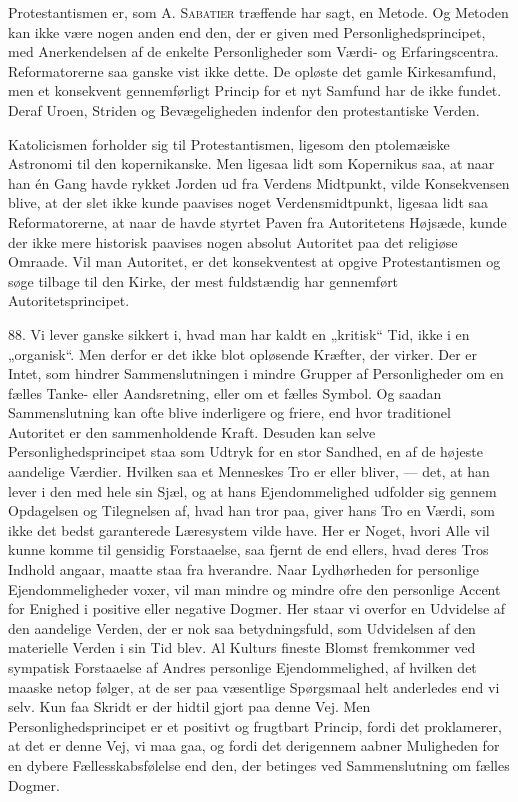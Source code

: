\documentclass[12pt,a4paper,openany]{book}
\newcommand{\opage}[1]{\marginnote{\footnotesize\textit{[#1]}}}
\begin{document}
Protestantismen er, som A. \textsc{Sabatier} træffende har sagt, en
Metode. Og Metoden kan ikke være nogen anden end den, der er given med
Personlighedsprincipet, med Anerkendelsen af de enkelte Personligheder
som Værdi- og Erfaringscentra. Reformatorerne saa ganske vist ikke
dette. De opløste det gamle Kirkesamfund, men et konsekvent
gennemførligt Princip for et nyt Samfund har de ikke fundet. Deraf
Uroen, Striden og Bevægeligheden indenfor den protestantiske Verden.

\opage{203}Katolicismen forholder sig til Protestantismen, ligesom den
ptolemæiske Astronomi til den kopernikanske. Men ligesaa lidt som
Kopernikus saa, at naar han én Gang havde rykket Jorden ud fra Verdens
Midtpunkt, vilde Konsekvensen blive, at der slet ikke kunde paavises
noget Verdensmidtpunkt, ligesaa lidt saa Reformatorerne, at naar de
havde styrtet Paven fra Autoritetens Højsæde, kunde der ikke mere
historisk paavises nogen absolut Autoritet paa det religiøse Omraade.
Vil man Autoritet, er det konsekventest at opgive Protestantismen og
søge tilbage til den Kirke, der mest fuldstændig har gennemført
Autoritetsprincipet.

88. Vi lever ganske sikkert i, hvad man har kaldt en „kritisk“ Tid, ikke
i en „organisk“. Men derfor er det ikke blot opløsende Kræfter, der
virker. Der er Intet, som hindrer Sammenslutningen i mindre Grupper af
Personligheder om en fælles Tanke- eller Aandsretning, eller om et
fælles Symbol. Og saadan Sammenslutning kan ofte blive inderligere og
friere, end hvor traditionel Autoritet er den sammenholdende Kraft.
Desuden kan selve Personlighedsprincipet staa som Udtryk for en stor
Sandhed, en af de højeste aandelige Værdier. Hvilken saa et Menneskes
Tro er eller bliver, --- det, at han lever i den med hele sin Sjæl, og
at hans Ejendommelighed udfolder sig gennem Opdagelsen og Tilegnelsen
af, hvad han tror paa, giver hans Tro en Værdi, som ikke det bedst
garanterede Læresystem vilde have. Her er Noget, hvori Alle vil kunne
komme til gensidig Forstaaelse, saa fjernt de end ellers, hvad deres
Tros Indhold angaar, maatte staa fra hverandre. Naar Lydhørheden for
personlige Ejendommeligheder voxer, vil man mindre og mindre ofre den
personlige Accent for Enighed i positive eller negative Dogmer. Her
staar vi overfor en Udvidelse af den aandelige Verden, der er nok saa
betydningsfuld, som Udvidelsen af den materielle Verden i sin Tid blev.
Al Kulturs fineste Blomst fremkommer ved sympatisk Forstaaelse af Andres
personlige Ejendommelighed, af hvilken det maaske netop følger, at de
ser paa væsentlige Spørgsmaal helt anderledes end vi selv. Kun faa
Skridt er der hidtil gjort paa denne Vej. Men Personlighedsprincipet er
et positivt og frugtbart Princip, fordi det proklamerer, at det er denne
Vej, vi maa gaa, og fordi det derigennem aabner Muligheden for en dybere
Fællesskabsfølelse end den, der betinges ved Sammenslutning om fælles
Dogmer.
\end{document}
